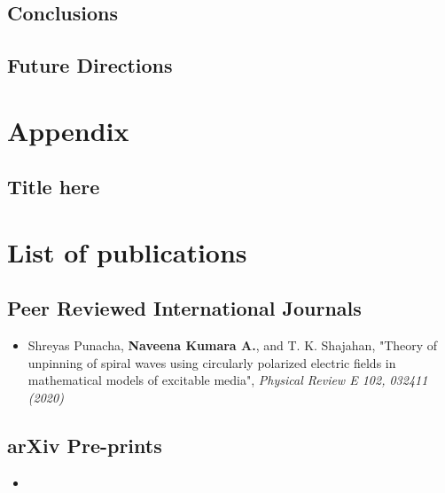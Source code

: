 \documentclass[12pt, twoside,openright]{report}
\begin{document}
\begin{spacing}{1.5}
\section{Conclusions}

\section{Future Directions}


\chapter*{Appendix}

\section*{Title here}






\end{spacing} 










\chapter*{List of publications}

\section*{Peer Reviewed International Journals}
\begin{itemize}
   
    \item
    Shreyas Punacha, {\bf Naveena Kumara A.}, and T. K. Shajahan,  "Theory of unpinning of spiral waves using circularly polarized electric fields in mathematical models of excitable media", \emph{Physical Review E 102, 032411 (2020)}
    \end{itemize}
    
   \section*{arXiv Pre-prints} 
   \begin{itemize}
   \item
\end{itemize}
\end{document}
